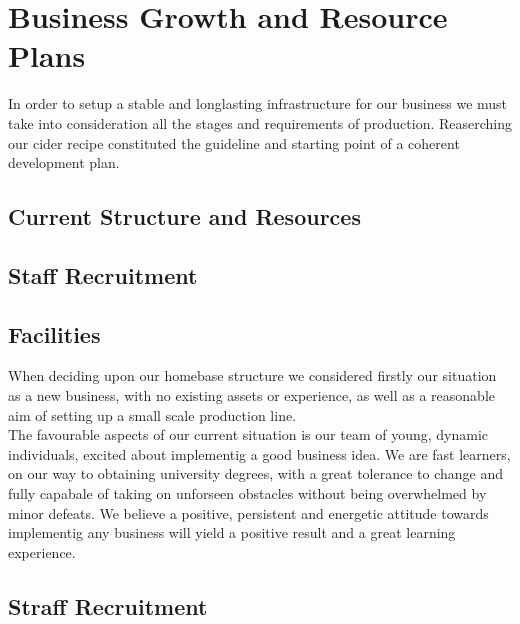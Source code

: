 \documentclass[11pt]{article}
\begin{document}
\section{Business Growth and Resource Plans}
In order to setup a stable and longlasting infrastructure for our business we must take into consideration all the stages and requirements of production. Reaserching our cider recipe constituted the guideline and starting point of a coherent development plan. 

  \subsection{Current Structure and Resources}

  \subsection{Staff Recruitment}
  \subsection{Facilities}
When deciding upon our homebase structure we considered firstly our situation as a new business, with no existing assets or experience, as well as a reasonable aim of setting up a small scale production line. \\

\noindent The favourable aspects of our current situation is our team of young, dynamic individuals, excited about implementig a good business idea. We are fast learners, on our way to obtaining university degrees, with a great tolerance to change and fully capabale of taking on unforseen obstacles without being overwhelmed by minor defeats. We believe a positive, persistent and energetic attitude towards implementig any business will yield a positive result and a great learning experience.

  \subsection{Straff Recruitment}

\end{document}
